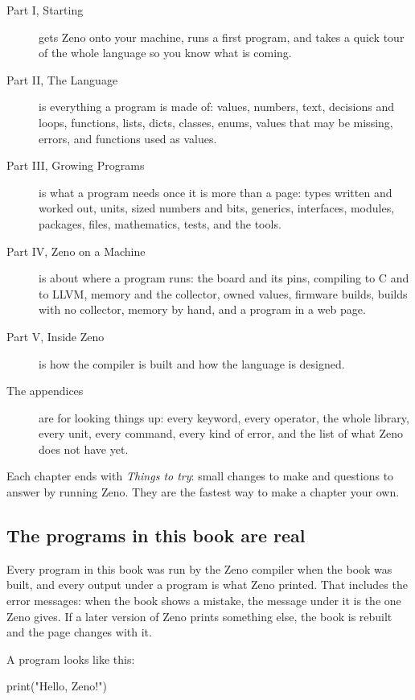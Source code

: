 \begin{description}
\item[Part I, Starting] gets Zeno onto your machine, runs a first
  program, and takes a quick tour of the whole language so you know
  what is coming.
\item[Part II, The Language] is everything a program is made of:
  values, numbers, text, decisions and loops, functions, lists,
  dicts, classes, enums, values that may be missing, errors, and
  functions used as values.
\item[Part III, Growing Programs] is what a program needs once it is
  more than a page: types written and worked out, units, sized
  numbers and bits, generics, interfaces, modules, packages, files,
  mathematics, tests, and the tools.
\item[Part IV, Zeno on a Machine] is about where a program runs: the
  board and its pins, compiling to C and to LLVM, memory and the
  collector, owned values, firmware builds, builds with no collector,
  memory by hand, and a program in a web page.
\item[Part V, Inside Zeno] is how the compiler is built and how the
  language is designed.
\item[The appendices] are for looking things up: every keyword, every
  operator, the whole library, every unit, every command, every kind
  of error, and the list of what Zeno does not have yet.
\end{description}

Each chapter ends with \emph{Things to try}: small changes to make and
questions to answer by running Zeno. They are the fastest way to make
a chapter your own.

\subsection*{The programs in this book are real}

Every program in this book was run by the Zeno compiler when the book
was built, and every output under a program is what Zeno printed. That
includes the error messages: when the book shows a mistake, the
message under it is the one Zeno gives. If a later version of Zeno
prints something else, the book is rebuilt and the page changes with
it.

A program looks like this:

\begin{zeno}
print("Hello, Zeno!")
\end{zeno}

